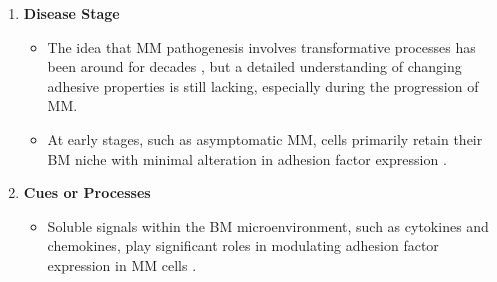 \begin{enumerate}
      \item \textbf{Disease Stage}
            \begin{itemize}
                  \item The idea that MM pathogenesis involves transformative
                        processes has been around for decades
                        \cite{hallekMultipleMyelomaIncreasing1998}, but a
                        detailed understanding of changing adhesive properties
                        is still lacking, especially during the progression of
                        MM.

                  \item At early stages, such as asymptomatic MM, cells primarily
                        retain their BM niche with minimal alteration in adhesion factor
                        expression \cite{abdallahModeProgressionSmoldering2024, akhmetzyanovaDynamicCD138Surface2020}.
            \end{itemize}

      \item \textbf{Cues or Processes}
            \begin{itemize}
                  \item Soluble signals within the BM microenvironment, such as
                        cytokines and chemokines, play significant roles in modulating
                        adhesion factor expression in MM cells
                        \cite{aggarwalChemokinesMultipleMyeloma2006, alsayedMechanismsRegulationCXCR42007}.
            \end{itemize}
\end{enumerate}

